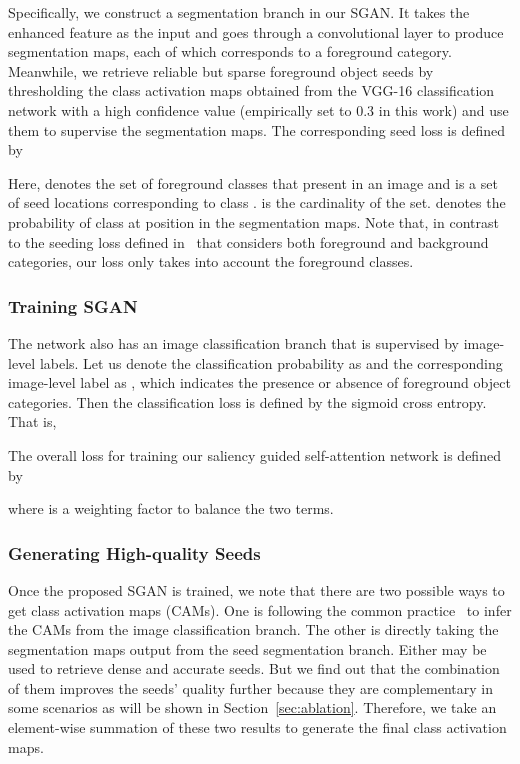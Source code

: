 \documentclass[journal]{IEEEtran}
\begin{document}
Specifically, we construct a segmentation branch in our SGAN. It takes the enhanced feature  as the input and goes through a convolutional layer to produce  segmentation maps, each of which corresponds to a foreground category. Meanwhile, we retrieve reliable but sparse foreground object seeds by thresholding the class activation maps obtained from the VGG-16 classification network with a high confidence value (empirically set to 0.3 in this work) and use them to supervise the segmentation maps. The corresponding seed loss  is defined by
 
Here,  denotes the set of foreground classes that present in an image and  is a set of seed locations corresponding to class .  is the cardinality of the set.  denotes the probability of class  at position  in the segmentation maps. Note that, in contrast to the seeding loss defined in~\cite{kolesnikov2016seed,huang2018weakly} that considers both foreground and background categories, our loss only takes into account the foreground classes. 



\subsubsection{Training SGAN} 
The network also has an image classification branch that is supervised by image-level labels. Let us denote the classification probability as  and the corresponding image-level label as , which indicates the presence or absence of foreground object categories. Then the classification loss  is defined by the sigmoid cross entropy. That is,


The overall loss for training our saliency guided self-attention network is defined by

where  is a weighting factor to balance the two terms.

\subsubsection{Generating High-quality Seeds} 
Once the proposed SGAN is trained, we note that there are two possible ways to get class activation maps (CAMs). One is following the common practice~\cite{zhou2016learning} to infer the CAMs from the image classification branch. The other is directly taking the segmentation maps output from the seed segmentation branch. Either may be used to retrieve dense and accurate seeds. But we find out that the combination of them improves the seeds' quality further because they are complementary in some scenarios as will be shown in Section~\ref{sec:ablation}. Therefore, we take an element-wise summation of these two results to generate the final class activation maps. 
\end{document}
